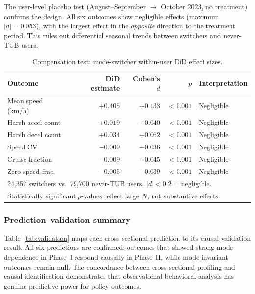 The user-level placebo test (August--September $\rightarrow$ October 2023, no treatment) confirms the design. All six outcomes show negligible effects (maximum $|d| = 0.053$), with the largest effect in the \textit{opposite} direction to the treatment period. This rules out differential seasonal trends between switchers and never-TUB users.

\begin{table}[htbp]
\centering
\caption{Compensation test: mode-switcher within-user DiD effect sizes.}
\label{tab:compensation}
\small
\begin{tabular}{lrrrl}
\toprule
\textbf{Outcome} & \textbf{DiD estimate} & \textbf{Cohen's} $d$ & $p$ & \textbf{Interpretation} \\
\midrule
Mean speed (km/h) & $+0.405$ & $+0.133$ & $<0.001$ & Negligible \\
Harsh accel count & $+0.019$ & $+0.040$ & $<0.001$ & Negligible \\
Harsh decel count & $+0.034$ & $+0.062$ & $<0.001$ & Negligible \\
Speed CV & $-0.009$ & $-0.036$ & $<0.001$ & Negligible \\
Cruise fraction & $-0.009$ & $-0.045$ & $<0.001$ & Negligible \\
Zero-speed frac. & $-0.005$ & $-0.039$ & $<0.001$ & Negligible \\
\bottomrule
\multicolumn{5}{l}{\footnotesize 24,357 switchers vs.\ 79,700 never-TUB users. $|d| < 0.2$ = negligible.} \\
\multicolumn{5}{l}{\footnotesize Statistically significant $p$-values reflect large $N$, not substantive effects.} \\
\end{tabular}
\end{table}

\subsubsection{Prediction--validation summary}

Table~\ref{tab:validation} maps each cross-sectional prediction to its causal validation result. All six predictions are confirmed: outcomes that showed strong mode dependence in Phase~I respond causally in Phase~II, while mode-invariant outcomes remain null. The concordance between cross-sectional profiling and causal identification demonstrates that observational behavioral analysis has genuine predictive power for policy outcomes.

